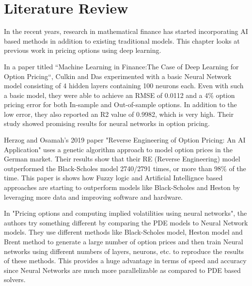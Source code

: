 
\chapter{Literature Review} %

\label{Chapter3} %


In the recent years, research in mathematical finance has started incorporating AI based methods in addition to existing traditional models. This chapter looks at previous work in pricing options using deep learning. 

In a paper titled “Machine Learning in Finance:The Case of Deep Learning for Option Pricing“\cite{Culkin2017MachineLI}, Culkin and Das experimented with a basic Neural Network model consisting of 4 hidden layers containing 100 neurons each. Even with such a basic model, they were able to achieve an RMSE of 0.0112 and a 4\% option pricing error for both In-sample and Out-of-sample options. In addition to the low error, they also reported an R2 value of 0.9982, which is very high. Their study showed promising results for neural networks in option pricing.

Herzog and Osamah's 2019 paper "Reverse Engineering of Option Pricing: An AI Application"\cite{Herzog2019ReverseEO} uses a genetic algorithm approach to model option prices in the German market. Their results show that their RE (Reverse Engineering) model outperformed the Black-Scholes model 2740/2791 times, or more than 98\% of the time. This paper is shows how Fuzzy logic and Artificial Intellignce based approaches are starting to outperform models like Black-Scholes and Heston by leveraging more data and improving software and hardware.


In "Pricing options and computing implied volatilities using neural networks"\cite{risks7010016}, the authors try something different by comparing the PDE models to Neural Network models. They use different methods like Black-Scholes model, Heston model and Brent method to generate a large number of option prices and then train Neural networks using different numbers of layers, neurons, etc. to reproduce the results of these methods. This provides a huge advantage in terms of speed and accuracy since Neural Networks are much more parallelizable as compared to PDE based solvers.

